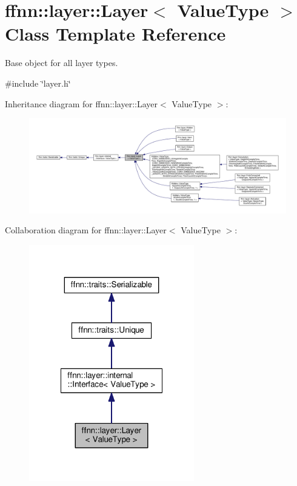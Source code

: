 \hypertarget{classffnn_1_1layer_1_1_layer}{\section{ffnn\-:\-:layer\-:\-:Layer$<$ Value\-Type $>$ Class Template Reference}
\label{classffnn_1_1layer_1_1_layer}
}


Base object for all layer types.  




{\ttfamily \#include \char`\"{}layer.\-h\char`\"{}}



Inheritance diagram for ffnn\-:\-:layer\-:\-:Layer$<$ Value\-Type $>$\-:
\nopagebreak
\begin{figure}[H]
\begin{center}
\leavevmode
\includegraphics[width=350pt]{classffnn_1_1layer_1_1_layer__inherit__graph}
\end{center}
\end{figure}


Collaboration diagram for ffnn\-:\-:layer\-:\-:Layer$<$ Value\-Type $>$\-:\nopagebreak
\begin{figure}[H]
\begin{center}
\leavevmode
\includegraphics[width=204pt]{classffnn_1_1layer_1_1_layer__coll__graph}
\end{center}
\end{figure}

